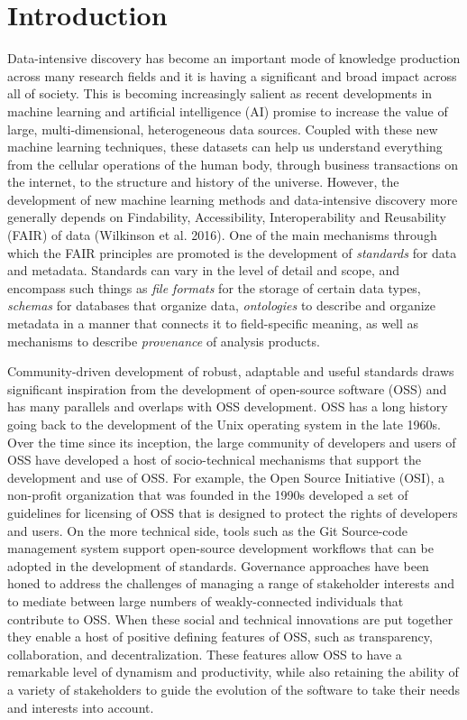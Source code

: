 \documentclass[
  letterpaper,
  DIV=11,
  numbers=noendperiod]{scrartcl}
\begin{document}
\section{Introduction}\label{introduction}

Data-intensive discovery has become an important mode of knowledge
production across many research fields and it is having a significant
and broad impact across all of society. This is becoming increasingly
salient as recent developments in machine learning and artificial
intelligence (AI) promise to increase the value of large,
multi-dimensional, heterogeneous data sources. Coupled with these new
machine learning techniques, these datasets can help us understand
everything from the cellular operations of the human body, through
business transactions on the internet, to the structure and history of
the universe. However, the development of new machine learning methods
and data-intensive discovery more generally depends on Findability,
Accessibility, Interoperability and Reusability (FAIR) of data
(Wilkinson et al. 2016). One of the main mechanisms through which the
FAIR principles are promoted is the development of \emph{standards} for
data and metadata. Standards can vary in the level of detail and scope,
and encompass such things as \emph{file formats} for the storage of
certain data types, \emph{schemas} for databases that organize data,
\emph{ontologies} to describe and organize metadata in a manner that
connects it to field-specific meaning, as well as mechanisms to describe
\emph{provenance} of analysis products.

Community-driven development of robust, adaptable and useful standards
draws significant inspiration from the development of open-source
software (OSS) and has many parallels and overlaps with OSS development.
OSS has a long history going back to the development of the Unix
operating system in the late 1960s. Over the time since its inception,
the large community of developers and users of OSS have developed a host
of socio-technical mechanisms that support the development and use of
OSS. For example, the Open Source Initiative (OSI), a non-profit
organization that was founded in the 1990s developed a set of guidelines
for licensing of OSS that is designed to protect the rights of
developers and users. On the more technical side, tools such as the Git
Source-code management system support open-source development workflows
that can be adopted in the development of standards. Governance
approaches have been honed to address the challenges of managing a range
of stakeholder interests and to mediate between large numbers of
weakly-connected individuals that contribute to OSS. When these social
and technical innovations are put together they enable a host of
positive defining features of OSS, such as transparency, collaboration,
and decentralization. These features allow OSS to have a remarkable
level of dynamism and productivity, while also retaining the ability of
a variety of stakeholders to guide the evolution of the software to take
their needs and interests into account.
\end{document}
